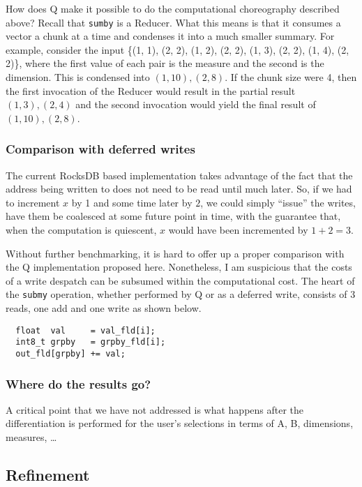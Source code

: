 How does Q make it possible to do the computational choreography described
above? Recall that {\tt sumby} is a Reducer. What this means is that it consumes
a vector a chunk at a time and condenses it into a much smaller summary. 
For example, consider the input 
\{(1, 1), (2, 2), (1, 2), (2, 2), (1, 3), (2, 2), (1, 4), (2, 2)\}, where the
first value of each pair is the measure and the second is the dimension.
This is condensed
into \((1, 10), (2, 8)\). If the chunk size were 4, then the first invocation of
the Reducer 
would result in the partial result 
\((1, 3), (2, 4)\) and the second invocation 
would yield the final result of 
\((1, 10), (2, 8)\). 

\subsubsection{Comparison with deferred writes}

The current RocksDB based implementation takes advantage of the fact that the
address being written to does not need to be read until much later. So, if we
had to increment \(x\) by 1 and some time later by \(2\), we could simply
``issue'' the writes, have them be coalesced at some future point in time, with
the guarantee that, when the computation is quiescent, \(x\) would have been
incremented by \(1 + 2 = 3\).

Without further benchmarking, it is hard to offer up a proper comparison with
the Q implementation proposed here. Nonetheless, I am suspicious that the costs
of a write despatch can be subsumed within the computational cost. The heart of
the {\tt submy} operation, whether performed by Q or as a deferred write,
consists of 3 reads, one add and one write as shown below.
\begin{verbatim}
  float  val     = val_fld[i];
  int8_t grpby   = grpby_fld[i];
  out_fld[grpby] += val;
\end{verbatim}

\subsubsection{Where do the results go?}

A critical point that we have not addressed is what happens after the
differentiation is performed for the user's selections in terms of A, B,
dimensions, measures, \ldots

\TBC

\subsection{Refinement}
\label{Refinement}


